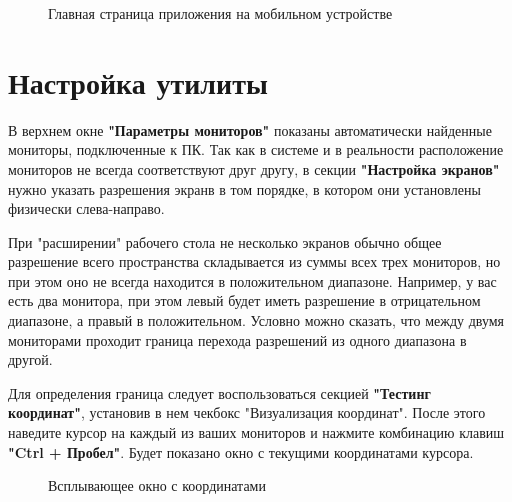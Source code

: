 \documentclass[a4paper]{article}
\begin{document}
\begin{figure}[h]
\caption{Главная страница приложения на мобильном устройстве}
\label{fig:image2}
\end{figure}

\newpage
\section{Настройка утилиты}

В верхнем окне \textbf{"Параметры мониторов"} показаны автоматически найденные мониторы, подключенные к ПК. Так как в системе и в реальности расположение мониторов не всегда соответствуют друг другу, в секции \textbf{"Настройка экранов"} нужно указать разрешения экранв в том порядке, в котором они установлены физически слева-направо.

При "расширении" рабочего стола не несколько экранов обычно общее разрешение всего пространства складывается из суммы всех трех мониторов, но при этом оно не всегда находится в положительном диапазоне. Например, у вас есть два монитора, при этом левый будет иметь разрешение в отрицательном диапазоне, а правый в положительном. Условно можно сказать, что между двумя мониторами проходит граница перехода разрешений из одного диапазона в другой. 

Для определения граница следует воспользоваться секцией \textbf{"Тестинг координат"}, установив в нем чекбокс "Визуализация координат". После этого наведите курсор на каждый из ваших мониторов и нажмите комбинацию клавиш \textbf{"Ctrl + Пробел"}. Будет показано окно с текущими координатами курсора.

\begin{figure}[h]
	\caption{Всплывающее окно с координатами}
	\label{fig:image3}
\end{figure}
\end{document}
